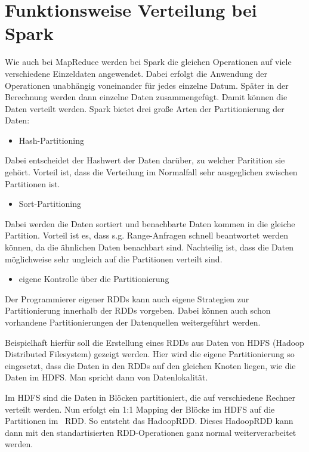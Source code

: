 \documentclass[letterpaper]{article}
\begin{document}
\section[Funktionsweise Verteilung bei
Spark]{\rmfamily Funktionsweise Verteilung bei
Spark}
Wie auch bei MapReduce werden bei Spark die gleichen Operationen auf
viele verschiedene Einzeldaten angewendet. Dabei erfolgt die Anwendung
der Operationen unabhängig voneinander für jedes einzelne Datum. Später
in der Berechnung werden dann einzelne Daten zusammengefügt. Damit
können die Daten verteilt werden. Spark bietet drei große Arten der
Partitionierung der Daten:

\begin{itemize}
\item Hash-Partitioning
\end{itemize}
Dabei entscheidet der Hashwert der Daten darüber, zu welcher Paritition
sie gehört. Vorteil ist, dass die Verteilung im Normalfall sehr
ausgeglichen zwischen Partitionen ist.

\begin{itemize}
\item Sort-Partitioning
\end{itemize}
Dabei werden die Daten sortiert und benachbarte Daten kommen in die
gleiche Partition. Vorteil ist es, dass s.g. Range-Anfragen schnell
beantwortet werden können, da die ähnlichen Daten benachbart sind.
Nachteilig ist, dass die Daten möglichweise sehr ungleich auf die
Partitionen verteilt sind.

\begin{itemize}
\item eigene Kontrolle über die Partitionierung
\end{itemize}
Der Programmierer eigener RDDs kann auch eigene Strategien zur
Partitionierung innerhalb der RDDs vorgeben. Dabei können auch schon
vorhandene Partitionierungen der Datenquellen weitergeführt werden.

Beispielhaft hierfür soll die Erstellung eines RDDs aus Daten von HDFS
(Hadoop Distributed Filesystem) gezeigt werden. Hier wird die eigene
Partitionierung so eingesetzt, dass die Daten in den RDDs auf den
gleichen Knoten liegen, wie die Daten im HDFS. Man spricht dann von
Datenlokalität.

Im HDFS sind die Daten in Blöcken partitioniert, die auf verschiedene
Rechner verteilt werden. Nun erfolgt ein 1:1 Mapping der Blöcke im HDFS
auf die Partitionen im \ RDD. So entsteht das HadoopRDD. Dieses
HadoopRDD kann dann mit den standartisierten RDD-Operationen ganz
normal weiterverarbeitet werden.
\end{document}
